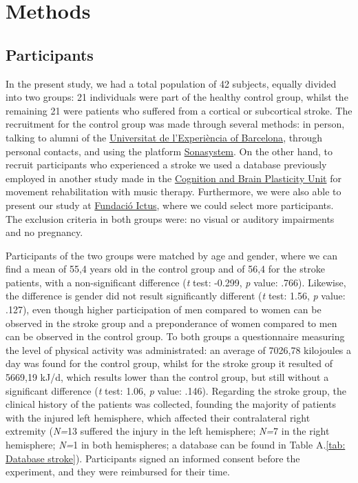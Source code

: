 \chapter{Methods}
\section{Participants}
In the present study, we had a total population of 42 subjects, equally divided into two groups: 21 individuals were part of the healthy control group, whilst the remaining 21 were patients who suffered from a cortical or subcortical stroke. The recruitment for the control group was made through several methods: in person, talking to alumni of the \href{https://www.experiencia.ub.edu/ca/}{Universitat de l'Experiència of Barcelona}, through personal contacts, and using the platform \href{https://www.sona-systems.com/}{Sonasystem}. 
On the other hand, to recruit participants who experienced a stroke we used a database previously employed in another study made in the \href{https://brainvitge.org/}{Cognition and Brain Plasticity Unit} for movement rehabilitation with music therapy. Furthermore, we were also able to present our study at \href{https://www.fundacioictus.com/}{Fundació Ictus}, where we could select more participants.  
The exclusion criteria in both groups were: no visual or auditory impairments and no pregnancy.

Participants of the two groups were matched by age and gender, where we can find a mean of 55,4 years old in the control group and of 56,4 for the stroke patients, with a non-significant difference (\textit{t} test: -0.299, \textit{p} value: .766). Likewise, the difference is gender did not result significantly different (\textit{t} test: 1.56, \textit{p} value: .127), even though higher participation of men compared to women can be observed in the stroke group and a preponderance of women compared to men can be observed in the control group. 
To both groups a questionnaire measuring the level of physical activity was administrated: an average of 7026,78 kilojoules a day was found for the control group, whilst for the stroke group it resulted of 5669,19 kJ/d, which results lower than the control group, but still without a significant difference (\textit{t} test: 1.06, \textit{p} value: .146). 
Regarding the stroke group, the clinical history of the patients was collected, founding the majority of patients with the injured left hemisphere, which affected their contralateral right extremity (\textit{N=}13 suffered the injury in the left hemisphere; \textit{N=}7 in the right hemisphere; \textit{N=}1 in both hemispheres; a database can be found in Table A.\ref{tab: Database stroke}). 
Participants signed an informed consent before the experiment, and they were reimbursed for their time. 

